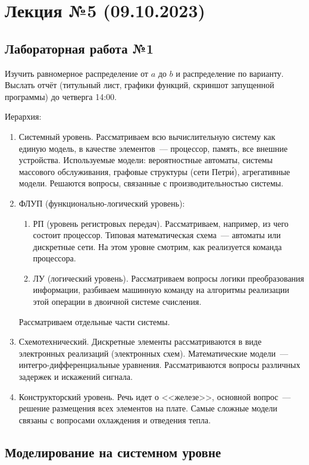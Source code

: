 \section{Лекция №5 (09.10.2023)}

\subsection{Лабораторная работа №1}

Изучить равномерное распределение от $a$ до $b$ и распределение по варианту. Выслать отчёт (титульный лист, графики функций, скриншот запущенной программы) до четверга 14:00.

Иерархия:

\begin{enumerate}
    \item Системный уровень. Рассматриваем всю вычислительную систему как единую модель, в качестве элементов~--- процессор, память, все внешние устройства. Используемые модели: вероятностные автоматы, системы массового обслуживания, графовые структуры (сети Петр\'{и}), агрегативные модели. Решаются вопросы, связанные с производительностью системы.
    \item ФЛУП (функционально-логический уровень):
          \begin{enumerate}
              \item РП (уровень регистровых передач). Рассматриваем, например, из чего состоит процессор. Типовая математическая схема~--- автоматы или дискретные сети. На этом уровне смотрим, как реализуется команда процессора.
              \item ЛУ (логический уровень). Рассматриваем вопросы логики преобразования информации, разбиваем машинную команду на алгоритмы реализации этой операции в двоичной системе счисления.
          \end{enumerate}
          Рассматриваем отдельные части системы.
    \item Схемотехнический. Дискретные элементы рассматриваются в виде электронных реализаций (электронных схем). Математические модели~--- интегро-дифференциальные уравнения. Рассматриваются вопросы различных задержек и искажений сигнала.
    \item Конструкторский уровень. Речь идет о <<железе>>, основной вопрос~--- решение размещения всех элементов на плате. Самые сложные модели связаны с вопросами охлаждения и отведения тепла.
\end{enumerate}

\subsection{Моделирование на системном уровне}

